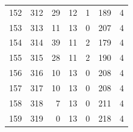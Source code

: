 \documentclass[a4paper,twoside,12pt]{book}
\begin{document}
\begin{appendices}
\begin{table}
\begin{tabular}{lrrrrrr}
		152 &    312 &        29 &        12 &               1 &             189 &         4 \\
		153 &    313 &        11 &        13 &               0 &             207 &         4 \\
		154 &    314 &        39 &        11 &               2 &             179 &         4 \\
		155 &    315 &        28 &        11 &               2 &             190 &         4 \\
		156 &    316 &        10 &        13 &               0 &             208 &         4 \\
		157 &    317 &        10 &        13 &               0 &             208 &         4 \\
		158 &    318 &         7 &        13 &               0 &             211 &         4 \\
		159 &    319 &         0 &        13 &               0 &             218 &         4 \\
		\bottomrule
	\end{tabular}		
\end{table}
   


\end{appendices}
\end{document}
